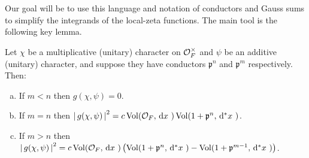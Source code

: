 \documentclass[11pt, x11names]{book}
\newcommand{\pp}{\mathfrak{p}}
\renewcommand{\brack}[1]{\left(   #1 \right)}
\newcommand{\abs}[1]{\left| \, #1  \,\right|}
\newcommand{\dx}{\, \mathrm{d}x \ }
\renewcommand{\d}[1]{\, \mathrm{d}#1 \ }
\DeclareMathOperator{\vol}{Vol}
\begin{document}
Our goal will be to use this language and notation of conductors and Gauss sums to simplify the integrands of the local-zeta functions. The main tool is the following key lemma.

\begin{lemma}
\label{lemma: gauss-sum conductor relations}
Let $\chi$ be a multiplicative (unitary) character on $\mathcal{O}_F^\times$ and $\psi$ be an additive (unitary) character, and suppose they have conductors $\pp^n$ and $\pp^m$ respectively. Then:
\begin{enumerate}[(a)]
    \item If $m < n$ then $g(\chi, \psi) = 0$.
    \item If $m = n$ then $\abs{g(\chi, \psi)}^2 = c \vol(\calo_F, \dx) \vol(1 + \pp^n, \d{^*x})$.
    \item If $m > n$ then $\abs{g(\chi, \psi)}^2 = c \vol(\calo_F, \dx) \brack{\vol(1 + \pp^n, \d{^*x}) - \vol(1 + \pp^{m-1}, \d{^*x})}$.
\end{enumerate}
\end{lemma}
\end{document}
